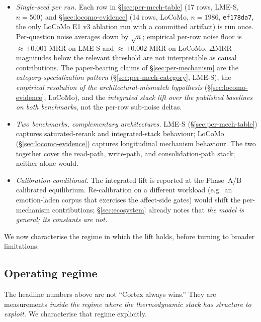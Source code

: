 \documentclass[11pt]{article}
\begin{document}
\begin{itemize}
\item \emph{Single-seed per run.}  Each row in
  \S\ref{sec:per-mech-table} (17 rows, LME-S, $n = 500$) and
  \S\ref{sec:locomo-evidence} (14 rows, LoCoMo, $n = 1986$,
  \texttt{ef178da7}, the only LoCoMo E1 v3 ablation run with a
  committed artifact) is run once.  Per-question noise averages
  down by $\sqrt{n}$; empirical per-row noise floor is $\approx
  \pm 0.001$ MRR on LME-S and $\approx \pm 0.002$ MRR on LoCoMo.
  $\Delta$MRR magnitudes below the relevant threshold are not
  interpretable as causal contributions.  The paper-bearing claims
  of \S\ref{sec:per-mechanism} are the
  \emph{category-specialization pattern}
  (\S\ref{sec:per-mech-category}, LME-S), the \emph{empirical
  resolution of the architectural-mismatch hypothesis}
  (\S\ref{sec:locomo-evidence}, LoCoMo), and the \emph{integrated
  stack lift over the published baselines on both benchmarks}, not
  the per-row sub-noise deltas.
\item \emph{Two benchmarks, complementary architectures.}  LME-S
  (\S\ref{sec:per-mech-table}) captures saturated-rerank and
  integrated-stack behaviour; LoCoMo (\S\ref{sec:locomo-evidence})
  captures longitudinal mechanism behaviour.  The two together cover
  the read-path, write-path, and consolidation-path stack; neither
  alone would.
\item \emph{Calibration-conditional.}  The integrated lift is
  reported at the Phase~A/B calibrated equilibrium.  Re-calibration
  on a different workload (e.g.\ an emotion-laden corpus that
  exercises the affect-side gates) would shift the per-mechanism
  contributions; \S\ref{sec:ecosystem} already notes that
  \emph{the model is general; its constants are not.}
\end{itemize}

\medskip
\noindent We now characterise the regime in which the lift holds,
before turning to broader limitations.

\subsection{Operating regime}
\label{sec:regime}

The headline numbers above are not ``Cortex always wins.''  They are
measurements \emph{inside the regime where the thermodynamic stack
has structure to exploit.}  We characterise that regime explicitly.
\end{document}
